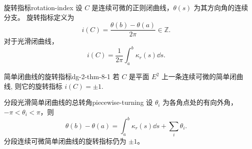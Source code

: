 \begin{definition}{旋转指标}{rotation-index}
设 $C$ 是连续可微的正则闭曲线，$\theta(s)$ 为其方向角的连续分支。
旋转指标定义为
\[
i(C)=\frac{\theta(b)-\theta(a)}{2\pi}\in\mathbb Z.
\]
对于光滑闭曲线，
\[
i(C)=\frac1{2\pi}\int_a^b\kappa_r(s)\dd s.
\]
\end{definition}

\begin{theorem}{简单闭曲线的旋转指标}{dg-2-thm-8-1}
若 \(C\) 是平面 \(E^2\) 上一条连续可微的简单闭曲线, 则它的旋转指标 \(i(C) = \pm 1\).
\end{theorem}

\begin{proposition}{分段光滑简单闭曲线的总转角}{piecewise-turning}
设 $\theta_i$ 为各角点处的有向外角，$-\pi<\theta_i<\pi$，则
\[
\theta(b)-\theta(a)=\int_a^b\kappa_r(s)\dd s+\sum_i\theta_i.
\]
分段连续可微简单闭曲线的旋转指标仍为 $\pm1$。
\end{proposition}
